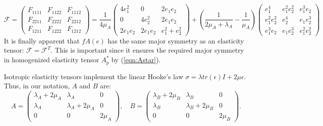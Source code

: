 \documentclass[10pt]{article}
\begin{document}
$$
\mathcal{F} = \begin{pmatrix} F_{1111} & F_{1122} & F_{1112} \\ 
                              F_{2211} & F_{2222} & F_{2212} \\
                              F_{1211} & F_{1222} & F_{1212} \end{pmatrix}
= \frac{1}{4 \mu_A}
 \begin{pmatrix}  4 e_1^2   &  0         &  2 e_1 e_2   \\
                  0         &  4 e_2^2   &  2 e_1 e_2   \\
                  2 e_1 e_2 &  2 e_1 e_2 &  e_1^2+e_2^2 \end{pmatrix}
+ \left(\frac{1}{2 \mu_A + \lambda_A} - \frac{1}{\mu_A}\right)
  \begin{pmatrix} e_1^4 & e_1^2 e_2^2 & e_1^3 e_2 \\ 
                              e_1^2 e_2^2 & e_2^4 & e_1 e_2^3 \\
                              e_1^3 e_2 & e_1 e_2^3 & e_1^2 e_2^2 \end{pmatrix}
$$
It is finally apparent that $fA(e)$ has the same major symmetry as an elasticity
tensor: $\mathcal{F} = \mathcal{F}^T$. This is important since it ensures
the required major symmetry in homogenized elasticity tensor $A^*_p$ by
(\ref{eqn:Astar}).

Isotropic elasticity tensors implement the linear Hooke's law $\sigma = \lambda
tr(\epsilon) I + 2 \mu \epsilon$. Thus, in our notation, $A$ and $B$ are:
$$
    A = \begin{pmatrix}
        \lambda_A + 2 \mu_A & \lambda_A         & 0 \\
        \lambda_A         & \lambda_A + 2 \mu_A & 0 \\
        0               & 0               & 2 \mu_A
        \end{pmatrix},\quad
    B = \begin{pmatrix}
        \lambda_B + 2 \mu_B & \lambda_B         & 0 \\
        \lambda_B         & \lambda_B + 2 \mu_B & 0 \\
        0               & 0               & 2 \mu_B
        \end{pmatrix}.
$$
\end{document}
